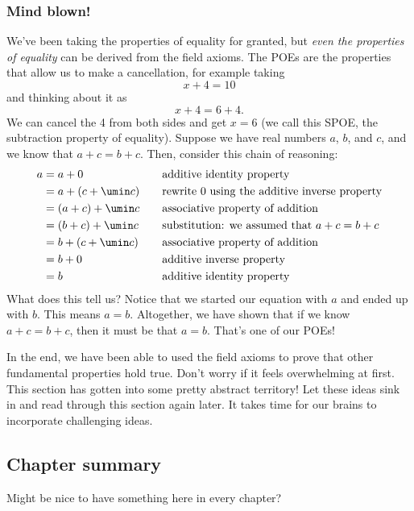 \subsubsection{Mind blown!}
We've been taking the properties of equality for granted, but \textit{even the properties of equality} can be derived from the field axioms. The POEs are the properties that allow us to make a cancellation, for example taking \[x + 4 = 10\] and thinking about it as \[x + 4 = 6 + 4.\] We can cancel the 4 from both sides and get $x = 6$ (we call this SPOE, the subtraction property of equality). Suppose we have real numbers $a$, $b$, and $c$, and we know that $a+c = b+c$. Then, consider this chain of reasoning:
\[\begin{aligned}
a &= a + 0
&& \quad\text{additive identity property}
\\
&= a + (c + \umin c)
&& \quad\text{rewrite 0 using the additive inverse property}
\\
&= (a + c) + \umin c
&& \quad\text{associative property of addition}
\\
&= (b + c) + \umin c
&& \quad\text{substitution: we assumed that $a+c = b+c$}
\\
&= b + (c + \umin c)
&& \quad\text{associative property of addition}
\\
&= b + 0
&& \quad\text{additive inverse property}
\\
&= b
&& \quad\text{additive identity property}
\end{aligned}\]
What does this tell us? Notice that we started our equation with $a$ and ended up with $b$. This means $a=b$. Altogether, we have shown that if we know $a+c = b+c$, then it must be that $a = b$. That's one of our POEs!

In the end, we have been able to used the field axioms to prove that other fundamental properties hold true. Don't worry if it feels overwhelming at first. This section has gotten into some pretty abstract territory! Let these ideas sink in and read through this section again later. It takes time for our brains to incorporate challenging ideas.

\subsection*{Chapter summary}

Might be nice to have something here in every chapter?
